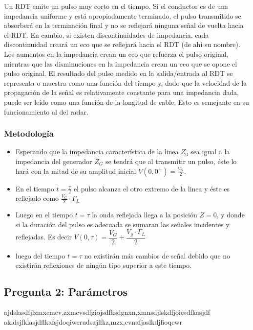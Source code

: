 \documentclass[11pt,onecolumn]{article}
\begin{document}
Un RDT emite un pulso muy corto en el tiempo. Si el conductor es de una impedancia uniforme
y está apropiadamente terminado, el pulso transmitido se absorberá en la terminación final
y no se reflejará ninguna señal de vuelta hacia el RDT. En cambio, si existen
discontinuidades de impedancia, cada discontinuidad creará un eco que se reflejará hacia el
RDT (de ahí su nombre). Los aumentos en la impedancia crean un eco que refuerza el pulso
original, mientras que las disminuciones en la impedancia crean un eco que se opone el
pulso original. El resultado del pulso medido en la salida/entrada al RDT se representa o
muestra como una función del tiempo y, dado que la velocidad de la propagación de la señal
es relativamente constante para una impedancia dada, puede ser leído como una función de la
longitud de cable. Esto es semejante en su funcionamiento al del radar.

\subsubsection*{Metodología}

\begin{itemize}
\item Esperando que la impedancia característica de la linea $Z_{0}$ sea igual a la impedancia del generador $Z_{G}$ se tendrá que al transmitir un pulso, éste lo hará con la mitad de su amplitud inicial $ V(0,0^{+}) = \frac{V_{G}}{2}$. 

\item En el tiempo $t = \frac{\tau}{2}$ el pulso alcanza el otro extremo de la linea y éste es reflejado como $\frac{V_{G}}{2} \cdot \Gamma_{L}$


\item Luego en el tiempo $t = \tau$ la onda reflejada llega a la posición $Z = 0$, y donde si la duración del pulso es adecuada se sumaran las señales incidentes y reflejadas. Es decir $V(0,\tau) = \dfrac{V_{G}}{2} + \dfrac{V_{g}\cdot \Gamma_{L}}{2}$ 

\item luego del tiempo $t = \tau$ no existirán más cambios de señal debido que no existirán reflexiones de ningún tipo superior a este tiempo.

\end{itemize}

\subsection*{Pregunta 2: Parámetros}
ajdslasdfjlzmxcmcv,zxmcvsdfgiojsdfksdgnxn,xmnsdjlskdfjoiesdfkasjdf
akldsjfklasjdflkafsjdoqiwerudsajlfkz,mzx,cvnafjaslkdjfioqewr
\end{document}
